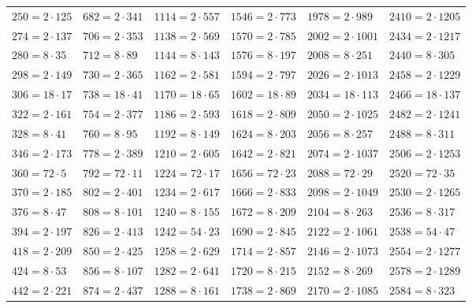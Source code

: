 \documentclass[11pt]{article}
\begin{document}
\begin{table}[ht]
\begin{tabular}{llllll}
$250=2\cdot125$ & $682=2\cdot341$ & $1114=2\cdot557$ & $1546=2\cdot773$ & $1978=2\cdot989$ & $2410=2\cdot1205$\\
$274=2\cdot137$ & $706=2\cdot353$ & $1138=2\cdot569$ & $1570=2\cdot785$ & $2002=2\cdot1001$ & $2434=2\cdot1217$\\
$280=8\cdot35$ & $712=8\cdot89$ & $1144=8\cdot143$ & $1576=8\cdot197$ & $2008=8\cdot251$ & $2440=8\cdot305$\\
$298=2\cdot149$ & $730=2\cdot365$ & $1162=2\cdot581$ & $1594=2\cdot797$ & $2026=2\cdot1013$ & $2458=2\cdot1229$\\
$306=18\cdot17$ & $738=18\cdot41$ & $1170=18\cdot65$ & $1602=18\cdot89$ & $2034=18\cdot113$ & $2466=18\cdot137$\\
$322=2\cdot161$ & $754=2\cdot377$ & $1186=2\cdot593$ & $1618=2\cdot809$ & $2050=2\cdot1025$ & $2482=2\cdot1241$\\
$328=8\cdot41$ & $760=8\cdot95$ & $1192=8\cdot149$ & $1624=8\cdot203$ & $2056=8\cdot257$ & $2488=8\cdot311$\\
$346=2\cdot173$ & $778=2\cdot389$ & $1210=2\cdot605$ & $1642=2\cdot821$ & $2074=2\cdot1037$ & $2506=2\cdot1253$\\
$360=72\cdot5$ & $792=72\cdot11$ & $1224=72\cdot17$ & $1656=72\cdot23$ & $2088=72\cdot29$ & $2520=72\cdot35$\\
$370=2\cdot185$ & $802=2\cdot401$ & $1234=2\cdot617$ & $1666=2\cdot833$ & $2098=2\cdot1049$ & $2530=2\cdot1265$\\
$376=8\cdot47$ & $808=8\cdot101$ & $1240=8\cdot155$ & $1672=8\cdot209$ & $2104=8\cdot263$ & $2536=8\cdot317$\\
$394=2\cdot197$ & $826=2\cdot413$ & $1242=54\cdot23$ & $1690=2\cdot845$ & $2122=2\cdot1061$ & $2538=54\cdot47$\\
$418=2\cdot209$ & $850=2\cdot425$ & $1258=2\cdot629$ & $1714=2\cdot857$ & $2146=2\cdot1073$ & $2554=2\cdot1277$\\
$424=8\cdot53$ & $856=8\cdot107$ & $1282=2\cdot641$ & $1720=8\cdot215$ & $2152=8\cdot269$ & $2578=2\cdot1289$\\
$442=2\cdot221$ & $874=2\cdot437$ & $1288=8\cdot161$ & $1738=2\cdot869$ & $2170=2\cdot1085$ & $2584=8\cdot323$\\
\hline
\end{tabular}
\end{table}
\end{document}
